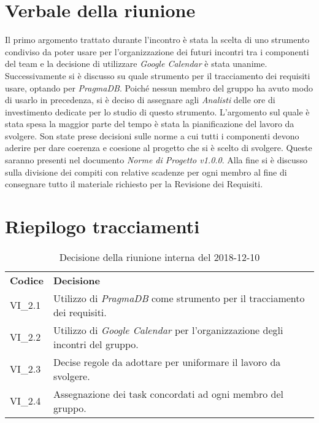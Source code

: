\section{Verbale della riunione}
Il primo argomento trattato durante l'incontro è stata la scelta di uno strumento 
condiviso da poter usare per l'organizzazione dei futuri incontri tra i componenti
del team e la decisione di utilizzare \textit{Google Calendar} è stata unanime.
Successivamente si è discusso su quale strumento per il tracciamento dei requisiti
usare, optando per \textit{PragmaDB}\glo{}. Poiché nessun membro del gruppo ha 
avuto modo di usarlo in precedenza, si è deciso di assegnare agli \textit{Analisti}
delle ore di investimento dedicate per lo studio di questo strumento. 
L'argomento sul quale è stata spesa la maggior parte del tempo è stata la 
pianificazione del lavoro da svolgere. Son state prese decisioni sulle norme a
cui tutti i componenti devono aderire per dare coerenza e coesione al progetto
che si è scelto di svolgere. Queste saranno presenti nel documento 
\textit{Norme di Progetto v1.0.0}. Alla fine si è discusso sulla divisione dei 
compiti con relative scadenze per ogni membro al fine di consegnare tutto il 
materiale richiesto per la Revisione dei Requisiti. 

\section{Riepilogo tracciamenti}
\begin{table}[H]
	
	\begin{longtable}{ >{\centering}p{} >{\centering}p{}}
			
		\rowcolorhead
		\centering \textbf{\color{white}Codice} 
		& \centering \textbf{\color{white}Decisione} 
		
		\tabularnewline 
		VI\_2.1 & Utilizzo di \textit{PragmaDB} come strumento per il tracciamento dei
				requisiti.
		
		\tabularnewline 
		VI\_2.2 & Utilizzo di \textit{Google Calendar} per l'organizzazione degli 
				incontri del gruppo.
		
		\tabularnewline 
		VI\_2.3 & Decise regole da adottare per uniformare il lavoro da svolgere.
	
		\tabularnewline 
		VI\_2.4 & Assegnazione dei task concordati ad ogni membro del gruppo.
	
	\end{longtable}
	\caption{Decisione della riunione interna del 2018-12-10}	

\end{table}



